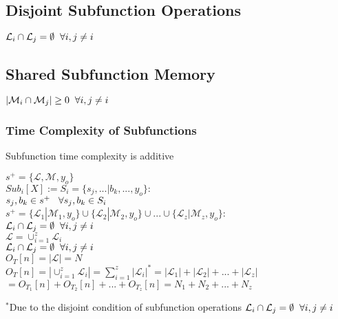 \documentclass[11pt]{article}
\begin{document}
\subsection{Disjoint Subfunction Operations}
\begin{center}
$
\mathcal{L}_i \cap \mathcal{L}_j = \emptyset \hspace{2mm} \forall i,j\neq i
$
\end{center}

\subsection{Shared Subfunction Memory}
\begin{center}
$
|\mathcal{M}_i \cap \mathcal{M}_j| \geq 0 \hspace{2mm} \forall i,j\neq i
$
\end{center}



\subsubsection{Time Complexity of Subfunctions}
Subfunction time complexity is additive
\begin{center}
$
s^+ = \{ \mathcal{L},\mathcal{M},y_o\}
$
\\ \vspace{6mm}
$
Sub_i[X] := S_i = \{s_j,...|b_k,...,y_o\}:
$
\\ \vspace{2mm}
$
s_j,b_k \in s^+ \hspace{3mm} \forall s_j,b_k \in S_i
$
\\ \vspace{6mm}
$
s^+ = \{ \mathcal{L}_1| \mathcal{M}_1,y_o\} \cup \{  \mathcal{L}_2| \mathcal{M}_2,y_o\} \cup ... \cup \{  \mathcal{L}_z| \mathcal{M}_z,y_o\} :
$
\\ \vspace{2mm}
$
\mathcal{L}_i \cap \mathcal{L}_j = \emptyset \hspace{2mm} \forall i,j\neq i
$
\\ \vspace{6mm}
$
\mathcal{L} = \cup_{i=1}^z \mathcal{L}_i
$
\\ \vspace{2mm}
$
\mathcal{L}_i \cap \mathcal{L}_j = \emptyset \hspace{2mm} \forall i,j\neq i
$
\\ \vspace{6mm}
$
O_T[n] = |\mathcal{L}| = N
$
\\ \vspace{2mm}
$
O_T[n]  =  |\cup_{i=1}^z \mathcal{L}_i| = \sum_{i=1}^z |\mathcal{L}_i|^*=|\mathcal{L}_1| + |\mathcal{L}_2|  + ... + |\mathcal{L}_z| 
$
\\ \vspace{2mm}
$
= O_{T_1}[n] + O_{T_2}[n] + ... + O_{T_z}[n] =  N_1 + N_2 + ... + N_z
$
\end{center}
\vspace{4mm}
$^*$Due to the disjoint condition of subfunction operations $\mathcal{L}_i \cap \mathcal{L}_j = \emptyset \hspace{2mm} \forall i,j\neq i$
\end{document}
